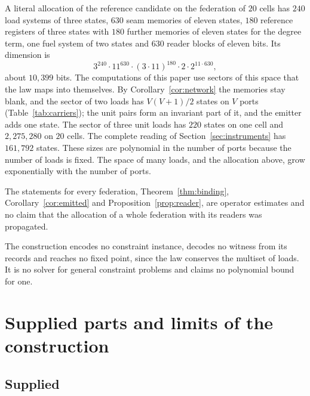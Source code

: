 \documentclass[11pt]{article}
\theoremstyle{definition}
\theoremstyle{remark}
\theoremstyle{plain}
\begin{document}
A literal allocation of the reference candidate on the federation of $20$
cells has $240$ load systems of three states, $630$ seam memories of eleven
states, $180$
reference registers of three states with $180$ further memories of eleven
states for the degree term, one fuel system of two states and $630$ reader
blocks of eleven bits. Its dimension is
\[
3^{240}\cdot11^{630}\cdot(3\cdot11)^{180}\cdot2\cdot2^{11\cdot630},
\]
about $10{,}399$ bits. The computations of this paper use sectors of this
space that the law maps into themselves. By Corollary~\ref{cor:network} the
memories stay blank, and the sector of two loads has $V(V+1)/2$ states on
$V$ ports (Table~\ref{tab:carriers}); the unit pairs form an invariant part
of it, and the emitter adds one state. The sector of three unit loads has
$220$ states on one cell and $2{,}275{,}280$ on $20$ cells. The complete
reading of Section~\ref{sec:instruments} has $161{,}792$ states. These
sizes are polynomial in the number of ports because the number of loads is
fixed. The space of many loads, and the allocation above, grow
exponentially with the number of ports.

The statements for every federation, Theorem~\ref{thm:binding},
Corollary~\ref{cor:emitted} and Proposition~\ref{prop:reader}, are operator
estimates and no claim that the allocation of a whole federation with its
readers was propagated.

The construction encodes no constraint
instance, decodes no witness from its records and reaches no fixed point,
since the law conserves the multiset of loads. It is no solver for general
constraint problems and claims no polynomial bound for one.


\section{Supplied parts and limits of the construction}
\label{sec:scope}

\subsection{Supplied}
\end{document}
